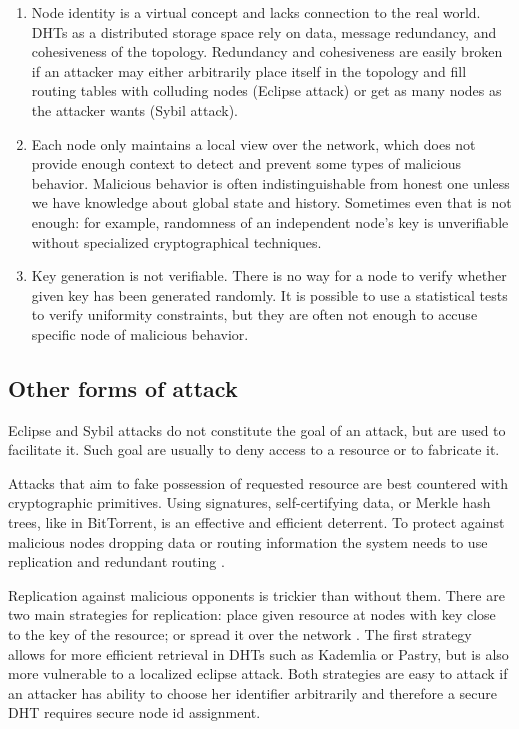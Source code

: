   \begin{enumerate}
    \item Node identity is a virtual concept and lacks connection to the real
      world. DHTs as a distributed storage space rely on data, message
      redundancy, and cohesiveness of the topology. Redundancy and cohesiveness
      are easily broken if an attacker may either arbitrarily place itself in
      the topology and fill routing tables with colluding nodes (Eclipse attack)
      or get as many nodes as the attacker wants (Sybil attack).

    \item Each node only maintains a local view over the network, which does not
      provide enough context to detect and prevent some types of malicious
      behavior.
      Malicious behavior is often indistinguishable from honest one unless we
      have knowledge about global state and history.
      Sometimes even that is not enough: for example, randomness of an
      independent node's key is unverifiable without specialized cryptographical
      techniques.

   \item  Key generation is not verifiable. There is no way for a node to verify
     whether given key has been generated randomly.
     It is possible to use a statistical tests to verify uniformity constraints,
     but they are often not enough to accuse specific node of malicious
     behavior.
  \end{enumerate}

\subsection{Other forms of attack}
  Eclipse and Sybil attacks do not constitute the goal of an attack, but are
  used to facilitate it. Such goal are usually to deny access to a resource or
  to fabricate it.

  Attacks that aim to fake possession of requested resource are best countered
  with cryptographic primitives. Using signatures, self-certifying data, or
  Merkle hash trees, like in BitTorrent, is an effective and efficient
  deterrent. To protect against malicious nodes dropping data or routing
  information the system needs to use replication and redundant routing
  \cite{dou02}. 

  Replication against malicious opponents is trickier than without them.
  There are two main strategies for replication: place given resource at nodes
  with key close to the key of the resource; or spread it over the network
  \cite[p.  38]{urd11}.
  The first strategy allows for more efficient retrieval in DHTs such as
  Kademlia or Pastry, but is also more vulnerable to a localized eclipse attack.
  Both strategies are easy to attack if an attacker has ability to choose her
  identifier arbitrarily and therefore a secure DHT requires secure node id
  assignment.


